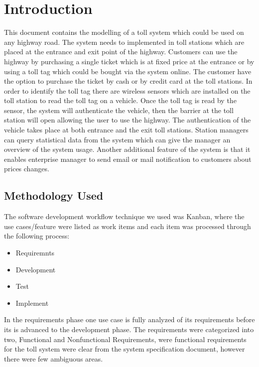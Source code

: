 \chapter{Introduction}
\noindent
This document contains the modelling of a toll system which could be used on any highway road. The system needs to implemented in toll stations which are placed at the entrance and exit point of the highway. Customers can use the highway by purchasing a single ticket which is at fixed price at the entrance or by using a toll tag which could be bought via the system online. The customer have the option to purchase the ticket by cash or by credit card at the toll stations. In order to identify the toll tag there are wireless sensors which are installed on the toll station to read the toll tag on a vehicle. Once the toll tag is read by the sensor, the system will authenticate the vehicle, then the barrier at the toll station will open allowing the user to use the highway. The authentication of the vehicle takes place at both entrance and the exit toll stations. Station managers can query statistical data from the system which can give the manager an overview of the system usage. Another additional feature of the system is that it enables enterprise manager to send email or mail notification to customers about prices changes.
\section{Methodology Used}
The software development workflow technique we used was Kanban, where the use cases/feature were listed as work items and each item was processed through the following process:

\begin{itemize}
  \item Requiremnts 
  \item Development
  \item Test
  \item Implement
\end{itemize}


In the requirements phase one use case is fully analyzed of its requirements before its is advanced to the development phase. The requirements were categorized into two, Functional and Nonfunctional Requirements, were functional requirements for the toll system were clear from the system specification document, however there were few ambiguous areas. 

